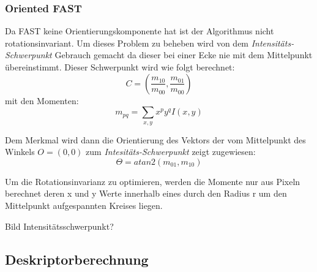 \subsubsection{Oriented FAST}
Da FAST keine Orientierungskomponente hat ist der Algorithmus nicht rotationsinvariant.
Um dieses Problem zu beheben wird von dem \emph{Intensitäts-Schwerpunkt} Gebrauch gemacht da dieser bei einer Ecke nie mit dem Mittelpunkt übereinstimmt.
Dieser Schwerpunkt wird wie folgt berechnet:
\begin{equation}
C = (\dfrac{m_{10}}{m_{00}}, \dfrac{m_{01}}{m_{00}})
\end{equation}
mit den Momenten:
\begin{equation}
m_{pq} = \sum_{x,y}x^p y^q I(x,y)
\end{equation}

Dem Merkmal wird dann die Orientierung des Vektors der vom Mittelpunkt des Winkels $O=(0,0)$ zum \emph{Intesitäts-Schwerpunkt} zeigt zugewiesen:
\begin{equation}
\Theta = atan2(m_{01},m_{10})
\end{equation}

Um die Rotationsinvarianz zu optimieren, werden die Momente nur aus Pixeln berechnet deren x und y Werte innerhalb eines durch den Radius r um den Mittelpunkt aufgespannten Kreises liegen.

Bild Intensitätsschwerpunkt?


\subsection{Deskriptorberechnung}

